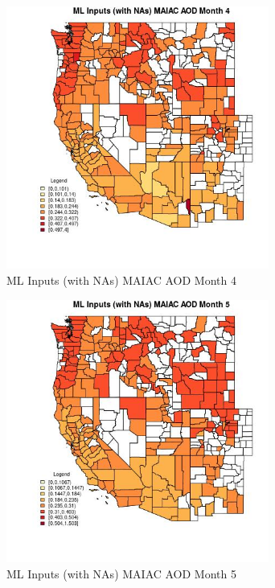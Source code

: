 \begin{figure} 
\centering  
\includegraphics[width=0.77\textwidth]{Code_Outputs/Report_ML_input_PM25_Step4_part_f_de_duplicated_aves_prioritize_24hr_obswNAs_CountyMAIAC_AODmedianMonth4.jpg} 
\caption{\label{fig:Report_ML_input_PM25_Step4_part_f_de_duplicated_aves_prioritize_24hr_obswNAsCountyMAIAC_AODmedianMonth4}ML Inputs (with NAs) MAIAC AOD Month 4} 
\end{figure} 
 

\begin{figure} 
\centering  
\includegraphics[width=0.77\textwidth]{Code_Outputs/Report_ML_input_PM25_Step4_part_f_de_duplicated_aves_prioritize_24hr_obswNAs_CountyMAIAC_AODmedianMonth5.jpg} 
\caption{\label{fig:Report_ML_input_PM25_Step4_part_f_de_duplicated_aves_prioritize_24hr_obswNAsCountyMAIAC_AODmedianMonth5}ML Inputs (with NAs) MAIAC AOD Month 5} 
\end{figure} 
 

